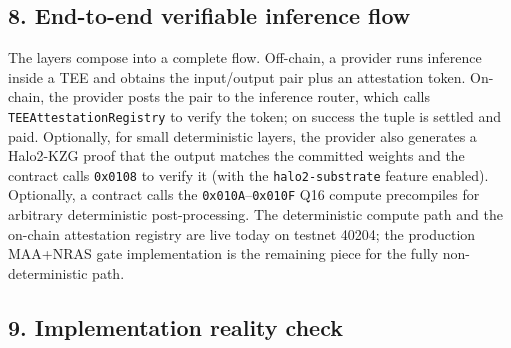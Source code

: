 \subsection{8. End-to-end verifiable inference
flow}\label{end-to-end-verifiable-inference-flow}

The layers compose into a complete flow. Off-chain, a provider runs
inference inside a TEE and obtains the input/output pair plus an
attestation token. On-chain, the provider posts the pair to the
inference router, which calls \texttt{TEEAttestationRegistry} to verify
the token; on success the tuple is settled and paid. Optionally, for
small deterministic layers, the provider also generates a Halo2-KZG
proof that the output matches the committed weights and the contract
calls \texttt{0x0108} to verify it (with the \texttt{halo2-substrate}
feature enabled). Optionally, a contract calls the
\texttt{0x010A}--\texttt{0x010F} Q16 compute precompiles for arbitrary
deterministic post-processing. The deterministic compute path and the
on-chain attestation registry are live today on testnet 40204; the
production MAA+NRAS gate implementation is the remaining piece for the
fully non-deterministic path.

\subsection{9. Implementation reality
check}\label{implementation-reality-check}

